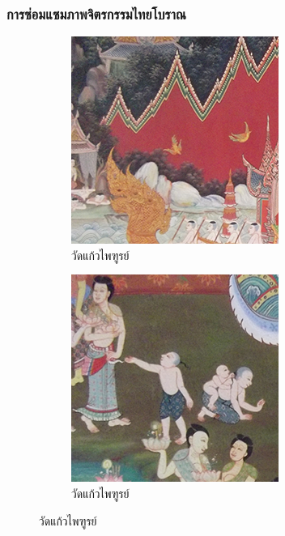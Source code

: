 \documentclass[xcolor=dvipsnames, xetex,serif]{beamer}
\numberwithin{equation}{section}
\begin{document}
    \begin{frame}
        \frametitle{การซ่อมแซมภาพจิตรกรรมไทยโบราณ}
        \begin{figure}[H]
            \centering
            \begin{subfigure}{0.3\linewidth}
                \centering
                \includegraphics[width=0.7\linewidth]{images/thaiart/case01-original.png}
                \caption{วัดแก้วไพฑูรย์}
                \label{image:thaiart_case01_original}
            \end{subfigure}
            \begin{subfigure}{0.3\linewidth}
                \centering
                \includegraphics[width=0.7\linewidth]{images/thaiart/case02-original.png}
                \caption{วัดแก้วไพฑูรย์}
                \label{image:thaiart_case02_original}

\end{subfigure}
\end{figure}
\end{frame}
\end{document}
